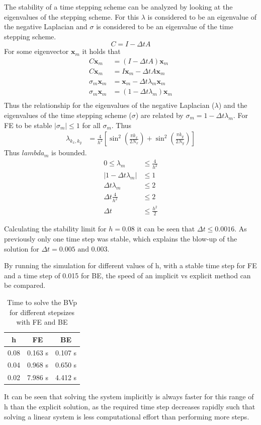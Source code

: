 \documentclass{article}
\begin{document}
The stability of a time stepping scheme can be analyzed by looking at the eigenvalues of the stepping scheme. For this $\lambda$ is considered to be an eigenvalue of the negative Laplacian and $\sigma$ is considered to be an eigenvalue of the time stepping scheme. 
\begin{equation}
	C = I - \Delta t A
\end{equation}
For some eigenvector $\mathbf{x}_m$ it holds that 
\begin{align}
C \mathbf{x}_m &= (I - \Delta t A)\mathbf{x}_m\\
C \mathbf{x}_m &= I\mathbf{x}_m - \Delta t A\mathbf{x}_m\\
\sigma_m \mathbf{x}_m &= \mathbf{x}_m - \Delta t \lambda_m \mathbf{x}_m\\
\sigma_m \mathbf{x}_m &= (1 - \Delta t \lambda_m )\mathbf{x}_m\\
\end{align}
Thus the relationship for the eigenvalues of the negative Laplacian ($\lambda$) and the eigenvalues of the time stepping scheme ($\sigma$) are related by $ \sigma_m = 1 - \Delta t \lambda_m$.
For FE to be stable $\left| \sigma_m\right|  \leq 1$ for all $\sigma_m$. Thus
\begin{align}
\lambda_{k_{x}, k_{y}}&=\frac{4}{h^{2}}\left[\sin ^{2}\left(\frac{\pi k_{x}}{2 N_{x}}\right)+\sin ^{2}\left(\frac{\pi k_{y}}{2 N_{y}}\right)\right]
\end{align}
Thus $lambda_m$ is bounded.
\begin{align}
0\leq\lambda_{m}&\leq\frac{4}{h^{2}}\\
\left| 1 - \Delta t \lambda_m \right| &\leq 1\\
\Delta t \lambda_m &\leq 2\\
\Delta t \frac{4}{h^{2}} &\leq 2\\
\Delta t  &\leq \frac{h^{2}}{2}
\end{align}

Calculating the stability limit for $h=0.08$ it can be seen that $\Delta t \leq 0.0016$. As previously only one time step was stable, which explains the blow-up of the solution for $\Delta t = 0.005 \text{ and } 0.003$.

By running the simulation for different values of h, with a stable time step for FE and a time step of 0.015 for BE, the speed of an implicit vs explicit method can be compared.

\begin{table}[H]
	\centering
\begin{tabular}{c|c|c}
	h 	 & FE & BE \\ \hline
	0.08 &0.163 s&0.107 s\\ \hline
	0.04 &0.968 s&0.650 s    \\ \hline
	0.02 &7.986 s&4.412 s    \\ \hline
\end{tabular}
\caption{Time to solve the BVp for different stepsizes with FE and BE}
\end{table}

It can be seen that solving the system implicitly is always faster for this range of h than the explicit solution, as the required time step decreases rapidly such that solving a linear system is less computational effort than performing more steps.

    
\end{document}
